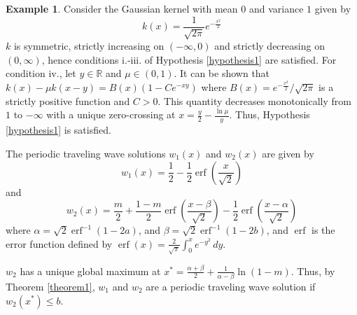 \documentclass[11pt]{article}
\theoremstyle{definition}
\newtheorem{ex}[thm]{Example}
\numberwithin{equation}{section}
\numberwithin{thm}{section}
\DeclareMathOperator\erf{erf}
\begin{document}
\begin{ex} Consider the Gaussian kernel with mean $0$ and variance $1$ given by
$$ k(x) = \frac{1}{\sqrt{2\pi}} e^{-\frac{x^2}{2}} $$
$k$ is symmetric, strictly increasing on $(-\infty,0)$ and strictly decreasing on $(0,\infty)$, hence conditions i.-iii. of Hypothesis \ref{hypothesis1} are satisfied. For condition iv., let $y \in \mathbb R$ and $\mu\in(0,1)$. It can be shown that $k(x) - \mu k(x-y) = B(x)(1-Ce^{-xy})$ where $B(x)=e^{-\frac{x^2}{2}}/\sqrt{2\pi}$ is a strictly positive function and $C>0$. This quantity decreases monotonically from $1$ to $-\infty$ with a unique zero-crossing at $x=\frac{y}{2}-\frac{\ln \mu}{y}$. Thus, Hypothesis \ref{hypothesis1} is satisfied.

The periodic traveling wave solutions $w_1(x)$ and $w_2(x)$ are given by
\begin{equation}
w_1(x) = \frac{1}{2} - \frac{1}{2}\erf\left(\frac{x}{\sqrt{2}}\right)
\end{equation}
and
\begin{equation}
w_2(x)=  \frac{m}{2} + \frac{1-m}{2} \erf \left( \frac{x-\beta}{\sqrt 2}\right) - \frac{1}{2} \erf \left( \frac{x-\alpha}{\sqrt2} \right)
\end{equation}
where $\alpha=\sqrt{2}\erf^{-1}\left(1-2a\right)$, and $\beta=\sqrt{2}\erf^{-1}\left(1-2b\right)$, and $\erf$ is the error function defined by $\erf(x) =\frac{2}{\sqrt\pi}\int_0^x e^{-y^2}\,dy$.

$w_2$ has a unique global maximum at $x^*=\frac{\alpha+\beta}{2} + \frac{1}{\alpha-\beta}\ln\left(1-m\right)$. Thus, by Theorem \ref{theorem1}, $w_1$ and $w_2$ are a periodic traveling wave solution if $w_2(x^*)\leq b$.
\end{ex}
\end{document}
